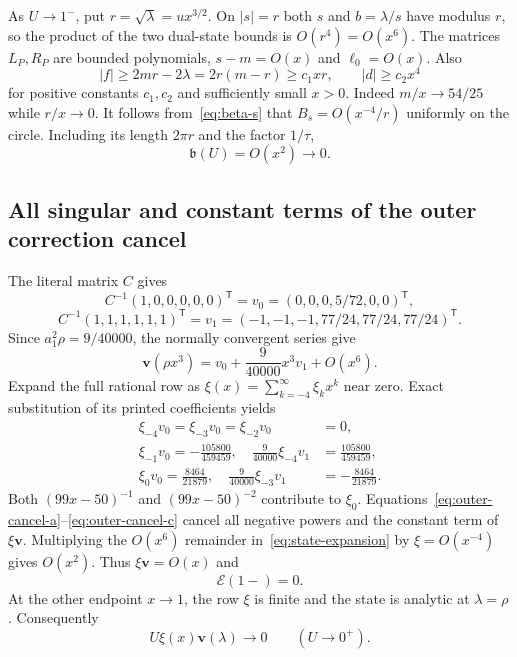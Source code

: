 \documentclass[11pt,a4paper]{article}
\newcommand{\tr}{\mathsf T}
\newcommand{\vv}{\mathbf v}
\begin{document}
As $U\to1^-$, put $r=\sqrt\lambda=u x^{3/2}$. On $|s|=r$ both $s$
and $b=\lambda/s$ have modulus $r$, so the product of the two dual-state
bounds is $O(r^4)=O(x^6)$. The matrices $L_P,R_P$ are bounded
polynomials, $s-m=O(x)$ and $\ell_0=O(x)$. Also
\[
 |f|\geq2mr-2\lambda=2r(m-r)\geq c_1xr,
 \qquad |d|\geq c_2x^4
\]
for positive constants $c_1,c_2$ and sufficiently small $x>0$.
Indeed $m/x\to54/25$ while $r/x\to0$.
It follows from~\eqref{eq:beta-s} that $B_s=O(x^{-4}/r)$ uniformly
on the circle. Including its length $2\pi r$ and the factor $1/\tau$,
\begin{equation}\label{eq:upper-beta}
 \mathfrak b(U)=O(x^2)\longrightarrow0.
\end{equation}

\subsection{All singular and constant terms of the outer correction cancel}
The literal matrix $C$ gives
\[
 C^{-1}(1,0,0,0,0,0)^{\tr}=v_0=(0,0,0,5/72,0,0)^{\tr},
\]
\[
 C^{-1}(1,1,1,1,1,1)^{\tr}
   =v_1=(-1,-1,-1,77/24,77/24,77/24)^{\tr}.
\]
Since $a_1^2\rho=9/40000$, the normally convergent series give
\begin{equation}\label{eq:state-expansion}
 \vv(\rho x^3)=v_0+\frac9{40000}x^3v_1+O(x^6).
\end{equation}
Expand the full rational row as $\xi(x)=\sum_{k=-4}^{\infty}\xi_kx^k$
near zero. Exact substitution of its printed coefficients yields
\begin{align}
 \xi_{-4}v_0=\xi_{-3}v_0=\xi_{-2}v_0&=0,\label{eq:outer-cancel-a}\\
 \xi_{-1}v_0=-\frac{105800}{459459},\quad
 \frac9{40000}\xi_{-4}v_1&=\frac{105800}{459459},\label{eq:outer-cancel-b}\\
 \xi_0v_0=\frac{8464}{21879},\quad
 \frac9{40000}\xi_{-3}v_1&=-\frac{8464}{21879}.
 \label{eq:outer-cancel-c}
\end{align}
Both $(99x-50)^{-1}$ and $(99x-50)^{-2}$ contribute to $\xi_0$.
Equations~\eqref{eq:outer-cancel-a}--\eqref{eq:outer-cancel-c} cancel
all negative powers and the constant term of $\xi\vv$.
Multiplying the $O(x^6)$ remainder in~\eqref{eq:state-expansion} by
$\xi=O(x^{-4})$ gives $O(x^2)$. Thus $\xi\vv=O(x)$ and
\begin{equation}\label{eq:upper-full}
 \mathcal E(1-)=0.
\end{equation}
At the other endpoint $x\to1$, the row $\xi$ is finite and the state is
analytic at $\lambda=\rho$. Consequently
\begin{equation}\label{eq:lower-outer}
 U\xi(x)\vv(\lambda)\longrightarrow0\qquad(U\to0^+).
\end{equation}
\end{document}
